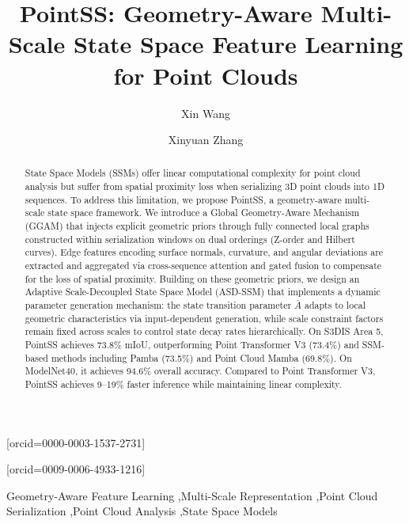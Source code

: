 \documentclass[a4paper,fleqn]{cas-sc}
\begin{document}
\let\WriteBookmarks\relax
\def\floatpagepagefraction{1}
\def\textpagefraction{.001}

\title [mode = title]{PointSS: Geometry-Aware Multi-Scale State Space Feature Learning for Point Clouds}
\author[1,2,3]{Xin Wang}[orcid=0000-0003-1537-2731]
\cormark[1]
\author[1]{Xinyuan Zhang}[orcid=0009-0006-4933-1216]


\begin{abstract}
State Space Models (SSMs) offer linear computational complexity for point cloud analysis but suffer from spatial proximity loss when serializing 3D point clouds into 1D sequences. To address this limitation, we propose PointSS, a geometry-aware multi-scale state space framework. We introduce a Global Geometry-Aware Mechanism (GGAM) that injects explicit geometric priors through fully connected local graphs constructed within serialization windows on dual orderings (Z-order and Hilbert curves). Edge features encoding surface normals, curvature, and angular deviations are extracted and aggregated via cross-sequence attention and gated fusion to compensate for the loss of spatial proximity. Building on these geometric priors, we design an Adaptive Scale-Decoupled State Space Model (ASD-SSM) that implements a dynamic parameter generation mechanism: the state transition parameter $\bar{A}$ adapts to local geometric characteristics via input-dependent generation, while scale constraint factors remain fixed across scales to control state decay rates hierarchically. On S3DIS Area 5, PointSS achieves 73.8\% mIoU, outperforming Point Transformer V3 (73.4\%) and SSM-based methods including Pamba (73.5\%) and Point Cloud Mamba (69.8\%). On ModelNet40, it achieves 94.6\% overall accuracy. Compared to Point Transformer V3, PointSS achieves 9--19\% faster inference while maintaining linear complexity.
\end{abstract}


\begin{keywords}
Geometry-Aware Feature Learning \sep Multi-Scale Representation \sep Point Cloud Serialization \sep Point Cloud Analysis \sep State Space Models
\end{keywords}
\end{document}
